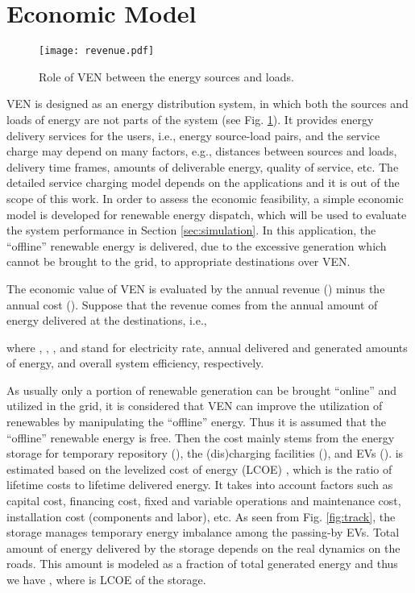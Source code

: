 \documentclass[journal]{IEEEtran}
\begin{document}
\section{Economic Model} \label{sec:economic}
\begin{figure}[!t]
\centering
\texttt{[image: revenue.pdf]}\vspace{-0.5cm}
\caption{Role of VEN between the energy sources and loads.}
\label{fig:revenue}
\end{figure}

VEN is designed as an energy distribution system, in which both the sources and loads of energy are not parts of the system (see Fig. \ref{fig:revenue}). It provides energy delivery services for the users, i.e., energy source-load pairs, and the service charge may depend on many factors, e.g., distances between sources and loads, delivery time frames, amounts of deliverable energy, quality of service, etc. The detailed service charging model depends on the applications and it is out of the scope of this work. In order to assess the economic feasibility, a simple economic model is developed for renewable energy dispatch, which will be used to evaluate the system performance in Section \ref{sec:simulation}. In this application, the ``offline'' renewable energy is delivered, due to the excessive generation which cannot be brought to the grid, to appropriate destinations over VEN.

The economic value of VEN is evaluated by the annual revenue () minus the annual cost (). Suppose that the revenue comes from the annual amount of energy delivered at the destinations, i.e.,

where , , , and  stand for electricity rate, annual delivered and generated amounts of energy, and overall system efficiency, respectively.

As usually only a portion of renewable generation can be brought ``online'' and utilized in the grid, it is considered that VEN can improve the utilization of renewables by manipulating the ``offline'' energy. Thus it is assumed that the ``offline'' renewable energy is free. Then the cost mainly stems from the energy storage for temporary repository (), the (dis)charging facilities (), and EVs (). 
 is estimated based on the levelized cost of energy (LCOE) \cite{storagecost}, which is the ratio of lifetime costs to lifetime delivered energy. It takes into account factors such as capital cost, financing cost, fixed and variable operations and maintenance cost, installation cost (components and labor), etc. As seen from Fig. \ref{fig:track}, the storage manages temporary energy imbalance among the passing-by EVs. Total amount of energy delivered by the storage depends on the real dynamics on the roads. This amount is modeled as a fraction  of total generated energy and thus we have , where  is LCOE of the storage.
 
\end{document}
